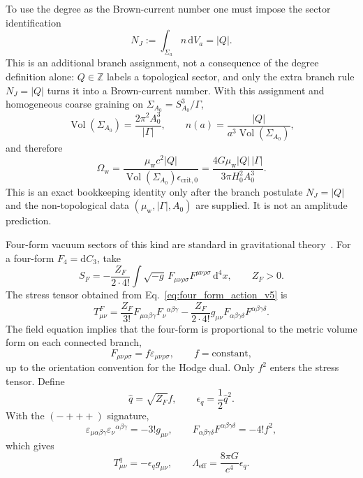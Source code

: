 \documentclass[
  aps,
  prd,
  reprint,
  superscriptaddress,
  floatfix,
  nofootinbib,
  longbibliography
]{revtex4-2}
\theoremstyle{plain}
\theoremstyle{definition}
\theoremstyle{remark}
\newcommand{\dd}{\mathrm d}
\newcommand{\wind}{\mathrm w}
\newcommand{\eff}{\mathrm{eff}}
\newcommand{\crit}{\mathrm{crit}}
\newcommand{\Ow}{\Omega_{\mathrm w}}
\DeclareMathOperator{\Vol}{Vol}
\newcommand{\eps}{\epsilon}
\newcommand{\qhat}{\widehat q}
\begin{document}
To use the degree as the Brown-current number one must impose the sector
identification
\begin{equation}
N_J:=\int_{\Sigma_a}n\,\dd V_a=|Q|.
\label{eq:degree_current_identification_v14}
\end{equation}
This is an additional branch assignment, not a consequence of the degree
definition alone: \(Q\in\mathbb Z\) labels a topological sector, and only the
extra branch rule \(N_J=|Q|\) turns it into a Brown-current number.  With this
assignment and homogeneous coarse graining on
\(\Sigma_{A_0}=S^3_{A_0}/\Gamma\),
\begin{equation}
\Vol(\Sigma_{A_0})=\frac{2\pi^2A_0^3}{|\Gamma|},
\qquad
n(a)=\frac{|Q|}{a^3\Vol(\Sigma_{A_0})},
\label{eq:volume_number_density_v5}
\end{equation}
and therefore
\begin{equation}
\Ow=
\frac{\mu_{\wind}c^2|Q|}{\Vol(\Sigma_{A_0})\eps_{\crit,0}}
=
\frac{4G\mu_{\wind}|Q|\,|\Gamma|}{3\pi H_0^2A_0^3} .
\label{eq:omega_w_v5}
\end{equation}
This is an exact bookkeeping identity only after the branch postulate
\(N_J=|Q|\) and the non-topological data \((\mu_{\wind},|\Gamma|,A_0)\) are
supplied.  It is not an amplitude prediction.

Four-form vacuum sectors of this kind are standard in gravitational theory~\cite{Aurilia,HenneauxTeitelboim,BrownTeitelboim,BoussoPolchinski}.  For a four-form \(F_4=\dd C_3\), take
\begin{equation}
S_F=-\frac{Z_F}{2\cdot4!}\int \sqrt{-g}\,
F_{\mu\nu\rho\sigma}F^{\mu\nu\rho\sigma}\,\dd^4x,
\qquad Z_F>0 .
\label{eq:four_form_action_v5}
\end{equation}
The stress tensor obtained from Eq.~\eqref{eq:four_form_action_v5} is
\begin{equation}
T^F_{\mu\nu}
=
\frac{Z_F}{3!}F_{\mu\alpha\beta\gamma}
F_{\nu}{}^{\alpha\beta\gamma}
-
\frac{Z_F}{2\cdot4!}g_{\mu\nu}F_{\alpha\beta\gamma\delta}
F^{\alpha\beta\gamma\delta} .
\label{eq:four_form_stress_general_v7}
\end{equation}
The field equation implies that the four-form is proportional to the metric
volume form on each connected branch,
\begin{equation}
F_{\mu\nu\rho\sigma}=f\varepsilon_{\mu\nu\rho\sigma},
\qquad
f=\text{constant},
\label{eq:four_form_branch_v8}
\end{equation}
up to the orientation convention for the Hodge dual.  Only \(f^2\) enters the
stress tensor.  Define
\begin{equation}
\qhat=\sqrt{Z_F}f,
\qquad
\eps_q=\frac12\qhat^2 .
\label{eq:four_form_energy_v5}
\end{equation}
With the \((-+++)\) signature,
\begin{equation}
\varepsilon_{\mu\alpha\beta\gamma}
\varepsilon_{\nu}{}^{\alpha\beta\gamma}=-3!g_{\mu\nu},
\qquad
F_{\alpha\beta\gamma\delta}F^{\alpha\beta\gamma\delta}=-4!f^2,
\end{equation}
which gives
\begin{equation}
T^q_{\mu\nu}=-\eps_q g_{\mu\nu},
\qquad
\Lambda_{\eff}=\frac{8\pi G}{c^4}\eps_q .
\label{eq:four_form_stress_v5}
\end{equation}
\end{document}
